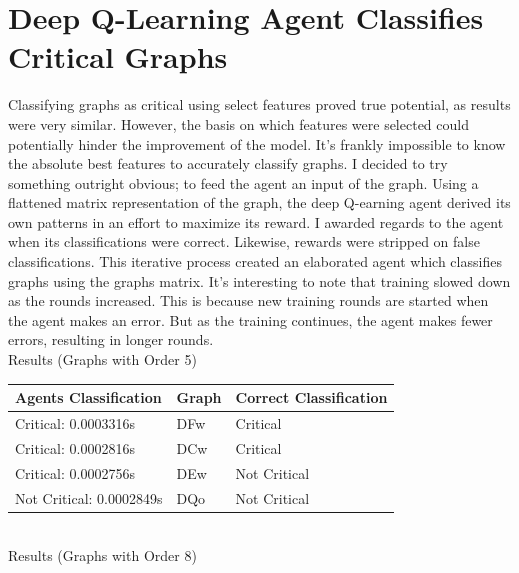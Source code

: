 \documentclass[12pt, letterpaper, twoside]{article}
\begin{document}
\section{Deep Q-Learning Agent Classifies Critical Graphs}
Classifying graphs as critical using select features proved true potential, as results were very similar. However, the basis on which features were selected could potentially hinder the improvement of the model. 
It's frankly impossible to know the absolute best features to accurately classify graphs.
I decided to try something outright obvious; to feed the agent an input of the graph. Using a flattened matrix representation of the graph, the deep Q-earning agent derived its own patterns in an effort to maximize its reward. I awarded regards to the agent when its classifications were correct. Likewise, rewards were stripped on false classifications. 
This iterative process created an elaborated agent which classifies graphs using the graphs matrix.
It's interesting to note that training slowed down as the rounds increased. This is because new training rounds are started when the agent makes an error. But as the training continues, the agent makes fewer errors, resulting in longer rounds.
\\

Results (Graphs with Order 5)

\begin{tabularx}{0.9\textwidth} { 
  | >{\raggedright\arraybackslash}X 
  | >{\centering\arraybackslash}X 
  | >{\raggedleft\arraybackslash}X | }
  
\toprule
Agents Classification & Graph & Correct Classification \\
\midrule

 Critical: 0.0003316s & DFw & Critical \\
 \hline
 Critical: 0.0002816s  & DCw & Critical  \\
 \hline
 Critical: 0.0002756s  & DEw & Not Critical  \\
 \hline
 Not Critical: 0.0002849s & DQo & Not Critical  \\

\hline
\end{tabularx}
\\[0.075in]

Results (Graphs with Order 8)
\end{document}
